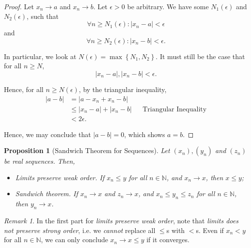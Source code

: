 \documentclass[11pt]{article}
\numberwithin{equation}{section}
\newtheorem{proposition}[theorem]{Proposition}
\theoremstyle{definition}
\theoremstyle{remark}
\newtheorem{remark}[theorem]{Remark}
\newcommand{\pqty}[1]{\left(#1\right)}
\newcommand{\Bqty}[1]{\left\{#1\right\}}
\newcommand{\abs}[1]{\left|#1\right|}
\newcommand{\NN}{\mathbb N}
\begin{document}
\begin{proof}
    Let \(x_n \to a\) and \(x_n \to b\). Let \(\epsilon > 0\) be arbitrary. We have some \(N_1 \pqty{\epsilon}\) and \(N_2 \pqty{\epsilon}\), such that
    \[
        \forall n \geq N_1\pqty{\epsilon}: \abs{x_n - a} < \epsilon
    \]
    and
    \[
        \forall n \geq N_2\pqty{\epsilon}: \abs{x_n - b} < \epsilon.
    \]

    In particular, we look at \(N\pqty{\epsilon} = \max\Bqty{N_1, N_2}\). It must still be the case that for all \(n \geq N\),
    \[
        \abs{x_n - a}, \abs{x_n - b} < \epsilon.
    \]

    Hence, for all \(n \geq N\pqty{\epsilon}\), by the triangular inequality,
    \begin{align*}
        \abs{a - b} &= \abs{a - x_n + x_n - b} \\
        &\leq \abs{x_n - a} + \abs{x_n - b} && \text{Triangular Inequality} \\
        &< 2\epsilon.
    \end{align*}

    Hence, we may conclude that \(\abs{a - b} = 0\), which shows \(a = b\).
\end{proof}

\begin{proposition}[Sandwich Theorem for Sequences]\label{analysis-unit-0008}
    \label{prop:seq-sandwich-theorem}%
    Let \(\pqty{x_n}, \pqty{y_n}\) and \(\pqty{z_n}\) be real sequences. Then,
    \begin{itemize}
        \item \emph{Limits preserve weak order.} If \(x_n \leq y\) for all \(n \in \NN\), and \(x_n \to x\), then \(x \leq y\);
        \item \emph{Sandwich theorem.} If \(x_n \to x\) and \(z_n \to x\), and \(x_n \leq y_n \leq z_n\) for all \(n \in \NN\), then \(y_n \to x\).
    \end{itemize}
\end{proposition}

\begin{remark}\label{analysis-unit-0009}
    In the first part for \emph{limits preserve weak order}, note that \emph{limits does not preserve strong order}, i.e. we \emph{cannot} replace all \(\leq\)s with \(<\)s. Even if \(x_n < y\) for all \(n \in \NN\), we can only conclude \(x_n \to x \leq y\) if it converges.
\end{remark}
\end{document}
